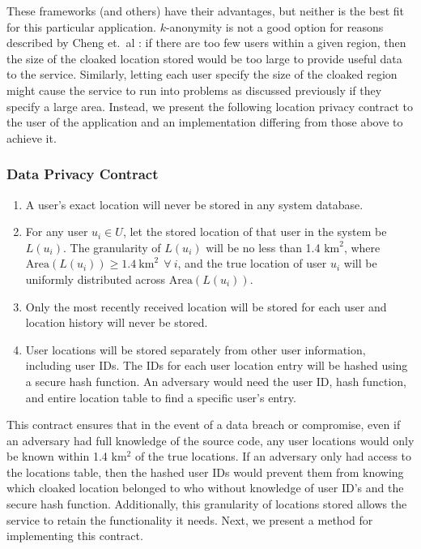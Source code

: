 These frameworks (and others) have their advantages, but neither is the best fit for this particular application. $k$-anonymity is not a good option for reasons described by Cheng et.~al \cite{Cheng2006}: if there are too few users within a given region, then the size of the cloaked location stored would be too large to provide useful data to the service. Similarly, letting each user specify the size of the cloaked region might cause the service to run into problems as discussed previously if they specify a large area. Instead, we present the following location privacy contract to the user of the application and an implementation differing from those above to achieve it.

\subsubsection{Data Privacy Contract}

\begin{enumerate}
    \item A user's exact location will never be stored in any system database.
    \item For any user $u_i \in U$, let the stored location of that user in the system be $L(u_i)$. The granularity of $L(u_i)$ will be no less than 1.4 $\text{km}^2$, where $\text{Area}(L(u_i)) \geq 1.4 \ \text{km}^2 \ \ \forall \ i$, and the true location of user $u_i$ will be uniformly distributed across $\text{Area}(L(u_i))$.
    \item Only the most recently received location will be stored for each user and location history will never be stored.
    \item User locations will be stored separately from other user information, including user IDs. The IDs for each user location entry will be hashed using a secure hash function. An adversary would need the user ID, hash function, and entire location table to find a specific user's entry.
\end{enumerate}

This contract ensures that in the event of a data breach or compromise, even if an adversary had full knowledge of the source code, any user locations would only be known within 1.4 km$^2$ of the true locations. If an adversary only had access to the locations table, then the hashed user IDs would prevent them from knowing which cloaked location belonged to who without knowledge of user ID's and the secure hash function. Additionally, this granularity of locations stored allows the service to retain the functionality it needs. Next, we present a method for implementing this contract.

